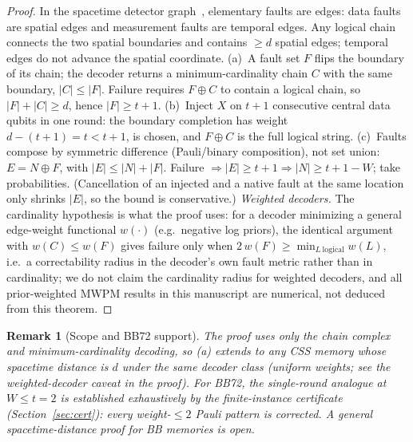\documentclass[11pt,a4paper]{article}
\newtheorem{remark}{Remark}
\begin{document}
\begin{proof}
In the spacetime detector graph~\cite{Dennis2002,Fowler2012},
elementary faults are edges: data
faults are spatial edges and measurement faults are temporal edges.
Any logical chain connects the two spatial boundaries and contains
$\ge d$ spatial edges; temporal edges do not advance the spatial
coordinate. (a)~A fault set $F$ flips the boundary of its chain; the
decoder returns a minimum-cardinality chain $C$ with the same boundary,
$|C|\le|F|$. Failure requires $F\oplus C$ to contain a logical chain,
so $|F|+|C|\ge d$, hence $|F|\ge t{+}1$. (b)~Inject $X$ on $t{+}1$
consecutive central data qubits in one round: the boundary completion
has weight $d-(t{+}1)=t<t{+}1$, is chosen, and $F\oplus C$ is the full
logical string. (c)~Faults compose by symmetric difference
(Pauli/binary composition), not set union: $E=N\oplus F$, with
$|E|\le|N|+|F|$. Failure $\Rightarrow|E|\ge t{+}1\Rightarrow
|N|\ge t{+}1-W$; take probabilities. (Cancellation of an injected and
a native fault at the same location only shrinks $|E|$, so the bound
is conservative.)
\emph{Weighted decoders.} The cardinality hypothesis is what the proof
uses: for a decoder minimizing a general edge-weight functional
$w(\cdot)$ (e.g.\ negative log priors), the identical argument with
$w(C)\le w(F)$ gives failure only when
$2\,w(F)\ge \min_{L\ \mathrm{logical}} w(L)$, i.e.\ a correctability
radius in the decoder's own fault metric rather than in cardinality;
we do not claim the cardinality radius for weighted decoders, and all
prior-weighted MWPM results in this manuscript are numerical, not
deduced from this theorem.
\end{proof}

\begin{remark}[Scope and BB72 support]
The proof uses only the chain complex and minimum-cardinality
decoding, so
(a) extends to any CSS memory whose spacetime distance is $d$ under the
same decoder class (uniform weights; see the weighted-decoder caveat in
the proof). For BB72, the single-round analogue at $W\le t=2$
is established \emph{exhaustively} by the finite-instance certificate
(Section~\ref{sec:cert}): every weight-$\le2$ Pauli pattern is
corrected. A general spacetime-distance proof for BB memories is open.
\end{remark}
\end{document}
